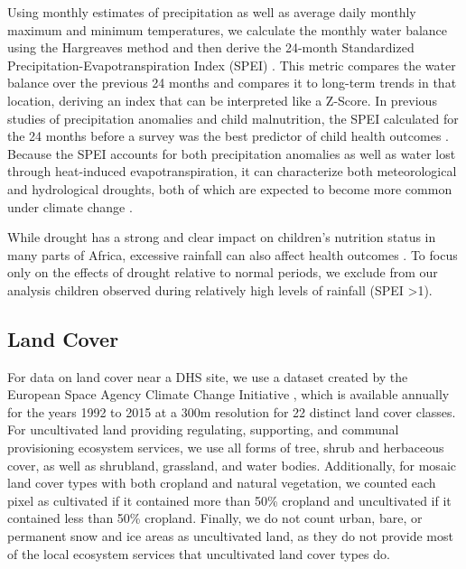 \documentclass{article}
\begin{document}
Using monthly estimates of precipitation as well as average daily monthly maximum and minimum temperatures, we calculate the monthly water balance using the Hargreaves method \cite{Hargreaves1982} and then derive the 24-month Standardized Precipitation-Evapotranspiration Index (SPEI) \cite{Begueria2014}.  This metric compares the water balance over the previous 24 months and compares it to long-term trends in that location, deriving an index that can be interpreted like a Z-Score.  In previous studies of precipitation anomalies and child malnutrition, the SPEI calculated for the 24 months before a survey was the best predictor of child health outcomes \cite{Cooper2019Mapping}.  Because the SPEI accounts for both precipitation anomalies as well as water lost through heat-induced evapotranspiration, it can characterize both meteorological and hydrological droughts, both of which are expected to become more common under climate change \cite{Dai2013}.

While drought has a strong and clear impact on children's nutrition status in many parts of Africa, excessive rainfall can also affect health outcomes \cite{Cooper2019Mapping}.  To focus only on the effects of drought relative to normal periods, we exclude from our analysis children observed during relatively high levels of rainfall (SPEI \textgreater 1).

\subsection{Land Cover}
For data on land cover near a DHS site, we use a dataset created by the European Space Agency Climate Change Initiative \cite{Defourny2017}, which is available annually for the years 1992 to 2015 at a 300m resolution for 22 distinct land cover classes.  For uncultivated land providing regulating, supporting, and communal provisioning ecosystem services, we use all forms of tree, shrub and herbaceous cover, as well as shrubland, grassland, and water bodies.  Additionally, for mosaic land cover types with both cropland and natural vegetation, we counted each pixel as cultivated if it contained more than 50\% cropland and uncultivated if it contained less than 50\% cropland.  Finally, we do not count urban, bare, or permanent snow and ice areas as uncultivated land, as they do not provide most of the local ecosystem services that uncultivated land cover types do.
\end{document}
